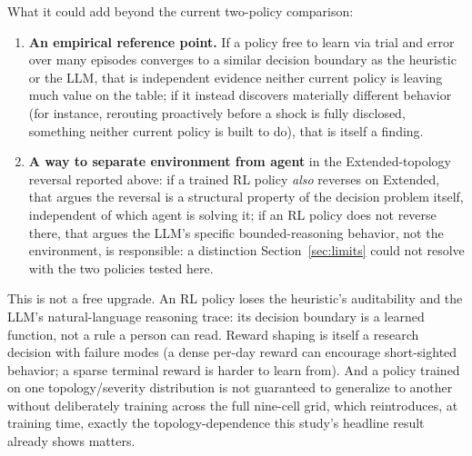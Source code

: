 \documentclass[10pt,twocolumn]{article}
\begin{document}
What it could add beyond the current two-policy comparison:

\begin{enumerate}[leftmargin=1.6em,itemsep=2pt,label=(\roman*)]
\item \textbf{An empirical reference point.} If a policy free to learn via trial and error over many episodes converges to a similar decision boundary as the heuristic or the LLM, that is independent evidence neither current policy is leaving much value on the table; if it instead discovers materially different behavior (for instance, rerouting proactively before a shock is fully disclosed, something neither current policy is built to do), that is itself a finding.
\item \textbf{A way to separate environment from agent} in the Extended-topology reversal reported above: if a trained RL policy \emph{also} reverses on Extended, that argues the reversal is a structural property of the decision problem itself, independent of which agent is solving it; if an RL policy does not reverse there, that argues the LLM's specific bounded-reasoning behavior, not the environment, is responsible: a distinction Section~\ref{sec:limits} could not resolve with the two policies tested here.
\end{enumerate}

This is not a free upgrade. An RL policy loses the heuristic's auditability and the LLM's natural-language reasoning trace: its decision boundary is a learned function, not a rule a person can read. Reward shaping is itself a research decision with failure modes (a dense per-day reward can encourage short-sighted behavior; a sparse terminal reward is harder to learn from). And a policy trained on one topology/severity distribution is not guaranteed to generalize to another without deliberately training across the full nine-cell grid, which reintroduces, at training time, exactly the topology-dependence this study's headline result already shows matters.
\end{document}
